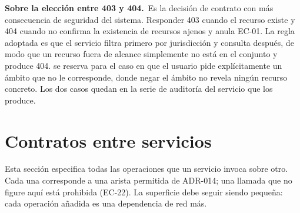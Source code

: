\documentclass[11pt,a4paper]{article}
\newcommand{\id}[1]{\path{#1}}
\newcommand{\nota}[2]{\par\vspace{0.05cm}\noindent\textbf{#1}\ #2\par\vspace{0.15cm}}
\begin{document}
\nota{Sobre la elección entre 403 y 404.}{Es la decisión de contrato con más consecuencia de seguridad del sistema. Responder 403 cuando el recurso existe y 404 cuando no confirma la existencia de recursos ajenos y anula EC-01. La regla adoptada es que el servicio filtra primero por jurisdicción y consulta después, de modo que un recurso fuera de alcance simplemente no está en el conjunto y produce 404. \id{fuera-de-jurisdiccion} se reserva para el caso en que el usuario pide explícitamente un ámbito que no le corresponde, donde negar el ámbito no revela ningún recurso concreto. Los dos casos quedan en la serie de auditoría del servicio que los produce.}

\section{Contratos entre servicios}
\label{sec:entreservicios}

Esta sección especifica todas las operaciones que un servicio invoca sobre otro. Cada una corresponde a una arista permitida de ADR-014; una llamada que no figure aquí está prohibida (EC-22). La superficie debe seguir siendo pequeña: cada operación añadida es una dependencia de red más.
\end{document}
